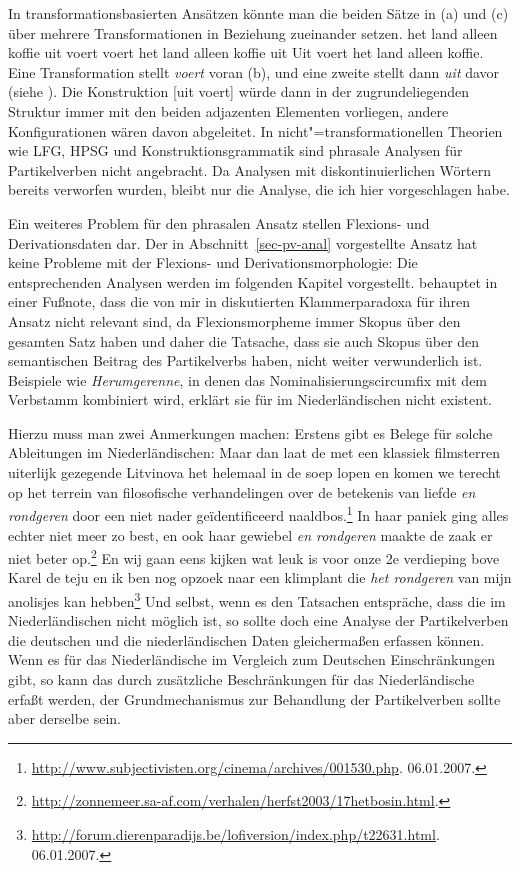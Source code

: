 %
In transformationsbasierten Ansätzen könnte man die beiden Sätze in (a) und (c)
über mehrere Transformationen in Beziehung zueinander setzen.
\eal
\ex het land alleen koffie uit voert
\ex voert het land alleen koffie uit
\ex Uit voert het land alleen koffie.
\zl
Eine Transformation stellt \emph{voert} voran (b), 
und eine zweite stellt dann \emph{uit} davor (siehe \zb {}).
Die Konstruktion [uit voert] würde dann in der zugrundeliegenden Struktur
immer mit den beiden adjazenten Elementen vorliegen, andere Konfigurationen wären 
davon abgeleitet. In nicht"=transformationellen
Theorien wie LFG, HPSG und Konstruktionsgrammatik sind phrasale Analysen für Partikelverben
nicht angebracht. Da Analysen mit diskontinuierlichen Wörtern bereits verworfen wurden,
bleibt nur die Analyse, die ich hier vorgeschlagen habe.
%

Ein weiteres Problem für den phrasalen Ansatz stellen Flexions- und Derivationsdaten
dar. Der in Abschnitt~\ref{sec-pv-anal} vorgestellte Ansatz hat keine Probleme mit der Flexions- und Derivationsmorphologie:
Die entsprechenden Analysen werden im folgenden Kapitel vorgestellt. \citet[]{Blom2005a}
behauptet in einer Fußnote, dass die von mir in  diskutierten Klammerparadoxa
für ihren Ansatz nicht relevant sind, da Flexionsmorpheme immer Skopus über den gesamten
Satz haben und daher die Tatsache, dass sie auch Skopus über den semantischen Beitrag des
Partikelverbs haben, nicht weiter verwunderlich ist. Beispiele wie \emph{Herumgerenne}, 
in denen das Nominalisierungscircumfix \gee mit dem Verbstamm kombiniert wird, erklärt
sie für im Niederländischen nicht existent.

Hierzu muss man zwei Anmerkungen machen: Erstens gibt es Belege für solche
Ableitungen im Niederländischen:
\eal
\ex Maar dan laat de met een klassiek filmsterren uiterlijk gezegende Litvinova het helemaal in de soep lopen en komen we terecht op het terrein van filosofische verhandelingen over de betekenis van liefde \emph{en rondgeren} 
door een niet nader geïdentificeerd naaldbos.\footnote{
\url{http://www.subjectivisten.org/cinema/archives/001530.php}. 06.01.2007.
}
\ex In haar paniek ging alles echter niet meer zo best, en ook haar gewiebel \emph{en rondgeren} maakte de zaak er niet beter op.\footnote{
\url{http://zonnemeer.sa-af.com/verhalen/herfst2003/17hetbosin.html}.
}
\ex En wij gaan eens kijken wat leuk is voor onze 2e verdieping bove Karel de teju en ik ben nog opzoek naar een klimplant die 
\emph{het rondgeren} van mijn anolisjes kan hebben\footnote{
\url{http://forum.dierenparadijs.be/lofiversion/index.php/t22631.html}. 06.01.2007.
}
\zl
Und selbst, wenn es den Tatsachen entspräche, dass die \geen im Niederländischen nicht
möglich ist, so sollte doch eine Analyse der Partikelverben die deutschen und die niederländischen
Daten gleichermaßen erfassen können. Wenn es für das Niederländische im Vergleich zum Deutschen
Einschränkungen gibt, so kann das durch zusätzliche Beschränkungen für das Niederländische
erfaßt werden, der Grundmechanismus zur Behandlung der Partikelverben sollte aber derselbe sein.

